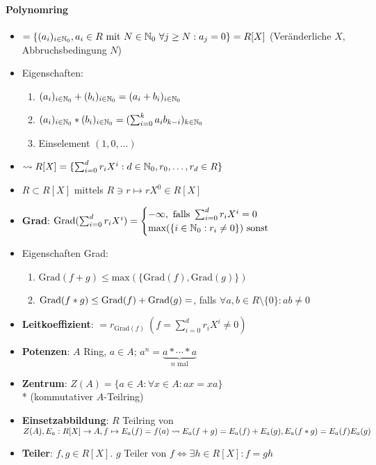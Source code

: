 \paragraph{Polynomring}
\begin{itemize}
  \item $=\{ (a_i)_{i \in \mathbb{N}_0}, a_i \in R \text{ mit } N \in \mathbb{N}_0 \ \forall j \geq N: a_j=0 \}=R[X]$ (Veränderliche $X$, Abbruchsbedingung $N$)
  \item Eigenschaften:
  \begin{enumerate}
    \item $(a_i)_{i \in \mathbb{N}_0}+(b_i)_{i \in \mathbb{N}_0} = (a_i+b_i)_{i \in \mathbb{N}_0}$
    \item $(a_i)_{i \in \mathbb{N}_0}*(b_i)_{i \in \mathbb{N}_0} = (\sum_{i=0}^k a_ib_{k-i})_{k \in \mathbb{N}_0}$
    \item Einselement $(1,0,\dots)$
  \end{enumerate}
  \item $\leadsto R[X]=\{ \sum_{i=0}^d r_iX^i : d \in \mathbb{N}_0, r_0,\dots,r_d \in R \}$
  \item $R \subset R[X]$ mittels $R \ni r \mapsto rX^0 \in R[X]$
  \item \textbf{Grad}: $\text{Grad}(\sum_{i=0}^d r_iX^i)=\begin{cases} -\infty, \text{ falls } \sum_{i=0}^d r_iX^i=0 \\ \text{max}(\{ i \in \mathbb{N}_0: r_i \neq 0 \} ) \text{ sonst} \end{cases}$
  \item Eigenschaften Grad:
  \begin{enumerate}
    \item $\text{Grad}(f+g) \leq \text{max}(\{ \text{Grad}(f), \text{Grad}(g) \})$
    \item $\text{Grad}(f*g) \leq \text{Grad}(f)+\text{Grad}(g) \\* =$, falls $\forall a,b \in R \setminus \{ 0 \}: ab \neq 0$
  \end{enumerate}
  \item \textbf{Leitkoeffizient}: $=r_{\text{Grad}(f)} \ (f = \sum_{i=0}^d r_iX^i \neq 0)$
  \item \textbf{Potenzen}: $A$ Ring, $a \in A$; $a^n = \underbrace{a*\cdots *a}_{n \text{ mal}}$
  \item \textbf{Zentrum}: $Z(A)=\{ a \in A : \forall x \in A : ax = xa \}$ \\* (kommutativer $A$-Teilring)
  \item \textbf{Einsetzabbildung}: $R$ Teilring von $Z(A), \\* E_a:R[X] \rightarrow A, f \mapsto E_a(f)=f(a) \\* \leadsto E_a(f+g)=E_a(f)+E_a(g), E_a(f*g)=E_a(f)E_a(g)$
  \item \textbf{Teiler}: $f,g \in R[X]$. $g$ Teiler von $f \Leftrightarrow  \exists h \in R[X]: f=gh$
\end{itemize}